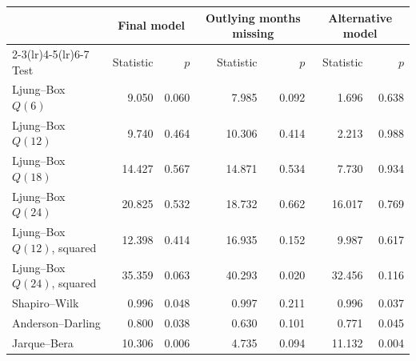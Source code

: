 \begin{tabular}{lrrrrrr}
\toprule
 & \multicolumn{2}{c}{Final model} & \multicolumn{2}{c}{Outlying months missing} & \multicolumn{2}{c}{Alternative model}\\
\cmidrule(lr){2-3}\cmidrule(lr){4-5}\cmidrule(lr){6-7}
Test & Statistic & $p$ & Statistic & $p$ & Statistic & $p$\\
\midrule
Ljung--Box $Q(6)$ & 9.050 & 0.060 & 7.985 & 0.092 & 1.696 & 0.638\\
Ljung--Box $Q(12)$ & 9.740 & 0.464 & 10.306 & 0.414 & 2.213 & 0.988\\
Ljung--Box $Q(18)$ & 14.427 & 0.567 & 14.871 & 0.534 & 7.730 & 0.934\\
Ljung--Box $Q(24)$ & 20.825 & 0.532 & 18.732 & 0.662 & 16.017 & 0.769\\
Ljung--Box $Q(12)$, squared & 12.398 & 0.414 & 16.935 & 0.152 & 9.987 & 0.617\\
Ljung--Box $Q(24)$, squared & 35.359 & 0.063 & 40.293 & 0.020 & 32.456 & 0.116\\
Shapiro--Wilk & 0.996 & 0.048 & 0.997 & 0.211 & 0.996 & 0.037\\
Anderson--Darling & 0.800 & 0.038 & 0.630 & 0.101 & 0.771 & 0.045\\
Jarque--Bera & 10.306 & 0.006 & 4.735 & 0.094 & 11.132 & 0.004\\
\bottomrule
\end{tabular}
